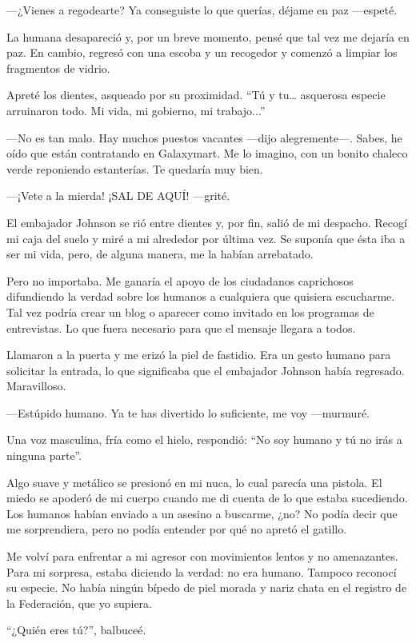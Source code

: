 —¿Vienes a regodearte? Ya conseguiste lo que querías, déjame en paz —espeté.

La humana desapareció y, por un breve momento, pensé que tal vez me dejaría en paz. En cambio, regresó con una escoba y un recogedor y comenzó a limpiar los fragmentos de vidrio.

Apreté los dientes, asqueado por su proximidad. ``Tú y tu… asquerosa especie arruinaron todo. Mi vida, mi gobierno, mi trabajo...''

—No es tan malo. Hay muchos puestos vacantes —dijo alegremente—. Sabes, he oído que están contratando en Galaxymart. Me lo imagino, con un bonito chaleco verde reponiendo estanterías. Te quedaría muy bien.

—¡Vete a la mierda! ¡SAL DE AQUÍ! —grité.

El embajador Johnson se rió entre dientes y, por fin, salió de mi despacho. Recogí mi caja del suelo y miré a mi alrededor por última vez. Se suponía que ésta iba a ser mi vida, pero, de alguna manera, me la habían arrebatado.

Pero no importaba. Me ganaría el apoyo de los ciudadanos caprichosos difundiendo la verdad sobre los humanos a cualquiera que quisiera escucharme. Tal vez podría crear un blog o aparecer como invitado en los programas de entrevistas. Lo que fuera necesario para que el mensaje llegara a todos.

Llamaron a la puerta y me erizó la piel de fastidio. Era un gesto humano para solicitar la entrada, lo que significaba que el embajador Johnson había regresado. Maravilloso.

—Estúpido humano. Ya te has divertido lo suficiente, me voy —murmuré.

Una voz masculina, fría como el hielo, respondió: ``No soy humano y tú no irás a ninguna parte''.

Algo suave y metálico se presionó en mi nuca, lo cual parecía una pistola. El miedo se apoderó de mi cuerpo cuando me di cuenta de lo que estaba sucediendo. Los humanos habían enviado a un asesino a buscarme, ¿no? No podía decir que me sorprendiera, pero no podía entender por qué no apretó el gatillo.

Me volví para enfrentar a mi agresor con movimientos lentos y no amenazantes. Para mi sorpresa, estaba diciendo la verdad: no era humano. Tampoco reconocí su especie. No había ningún bípedo de piel morada y nariz chata en el registro de la Federación, que yo supiera.

``¿Quién eres tú?'', balbuceé.

